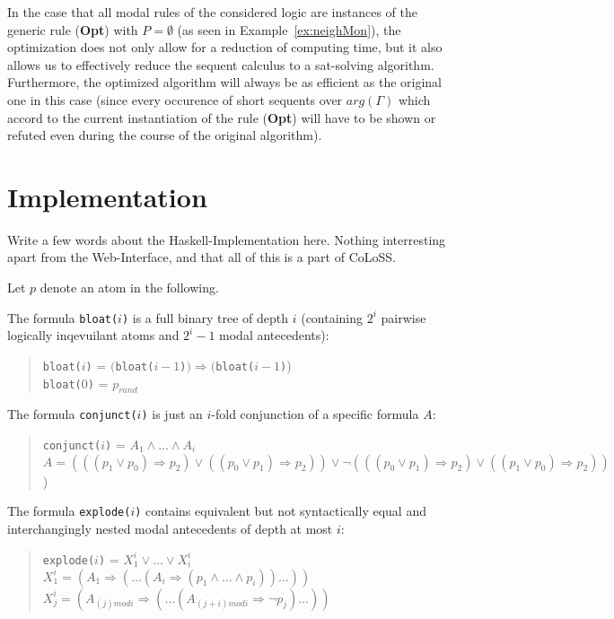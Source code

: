 \documentclass{entcs} \usepackage{entcsmacro}
\begin{document}
\begin{remark}
In the case that all modal rules of the considered logic are instances of
the generic rule (\textbf{Opt}) with $P=\emptyset$ (as seen in Example~\ref{ex:neighMon}),
the optimization does not only allow for a reduction of computing time, but
it also allows us to effectively reduce the sequent calculus to a sat-solving
algorithm.
Furthermore, the optimized algorithm will always be as efficient as the
original one in this case (since every occurence of short sequents over $arg(\Gamma)$ 
which accord to the current instantiation of the rule (\textbf{Opt}) will
have to be shown or refuted even during the course of the original algorithm).
\end{remark}

\section{Implementation}

Write a few words about the Haskell-Implementation here. Nothing interresting apart
from the Web-Interface, and that all of this is a part of CoLoSS.

Let $p$ denote an atom in the following.

The formula \verb|bloat(|$i$\verb|)| is a full binary tree of depth $i$ (containing $2^i$ pairwise logically
inqevuilant atoms and $2^i-1$ modal antecedents):
\begin{quote}
\verb|bloat(|$i$\verb|)| = $($\verb|bloat(|$i-1$\verb|)|$)\Rightarrow($\verb|bloat(|$i-1$\verb|)|)\\
\verb|bloat(|$0$\verb|)| = $p_{rand}$
\end{quote}

The formula \verb|conjunct(|$i$\verb|)| is just an $i$-fold conjunction of a specific formula $A$:
\begin{quote}
\verb|conjunct(|$i$\verb|)| = $A_1\wedge\ldots\wedge A_i$\\
$A=(((p_1\vee p_0)\Rightarrow p_2)\vee((p_0\vee p_1)\Rightarrow p_2))\vee\neg(((p_0\vee p_1)\Rightarrow p_2)\vee((p_1\vee p_0)\Rightarrow p_2))$)
\end{quote}

The formula \verb|explode(|$i$\verb|)| contains equivalent but not syntactically equal and interchangingly nested modal antecedents of depth at most $i$:
\begin{quote}
\verb|explode(|$i$\verb|)| = $X^i_1\vee\ldots\vee X^i_i$\\
$X^i_1=(A_1\Rightarrow(\ldots(A_i\Rightarrow (p_1\wedge\ldots\wedge p_i))\ldots))$\\
$X^i_j=(A_{(j)mod i}\Rightarrow(\ldots(A_{(j+i)mod i}\Rightarrow \neg p_j)\ldots))$
\end{quote}
\end{document}
